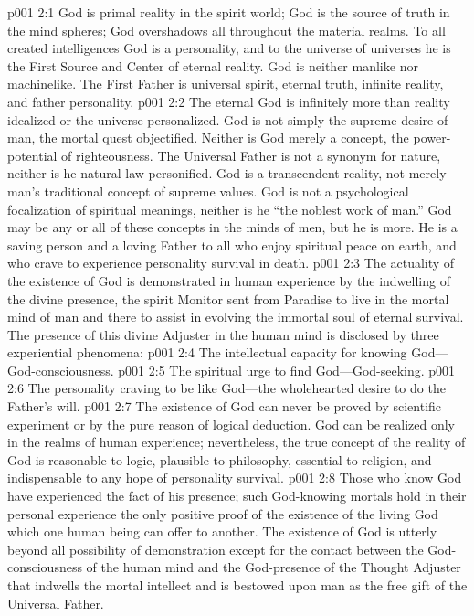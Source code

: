 \vs p001 2:1 God is primal reality in the spirit world; God is the source of truth in the mind spheres; God overshadows all throughout the material realms. To all created intelligences God is a personality, and to the universe of universes he is the First Source and Center of eternal reality. God is neither manlike nor machinelike. The First Father is universal spirit, eternal truth, infinite reality, and father personality.
\pc \vs p001 2:2 The eternal God is infinitely more than reality idealized or the universe personalized. God is not simply the supreme desire of man, the mortal quest objectified. Neither is God merely a concept, the power\hyp{}potential of righteousness. The Universal Father is not a synonym for nature, neither is he natural law personified. God is a transcendent reality, not merely man’s traditional concept of supreme values. God is not a psychological focalization of spiritual meanings, neither is he “the noblest work of man.” God may be any or all of these concepts in the minds of men, but he is more. He is a saving person and a loving Father to all who enjoy spiritual peace on earth, and who crave to experience personality survival in death.\plusone
\pc \vs p001 2:3 The actuality of the existence of God is demonstrated in human experience by the indwelling of the divine presence, the spirit Monitor sent from Paradise to live in the mortal mind of man and there to assist in evolving the immortal soul of eternal survival. The presence of this divine Adjuster in the human mind is disclosed by three experiential phenomena:
\pc \vs p001 2:4 \bibnobreakspace The intellectual capacity for knowing God---God\hyp{}consciousness.
\vs p001 2:5 \bibnobreakspace The spiritual urge to find God---God\hyp{}seeking.
\vs p001 2:6 \bibnobreakspace The personality craving to be like God---the wholehearted desire to do the Father’s will.
\pc \vs p001 2:7 The existence of God can never be proved by scientific experiment or by the pure reason of logical deduction. God can be realized only in the realms of human experience; nevertheless, the true concept of the reality of God is reasonable to logic, plausible to philosophy, essential to religion, and indispensable to any hope of personality survival.
\vs p001 2:8 Those who know God have experienced the fact of his presence; such God\hyp{}knowing mortals hold in their personal experience the only positive proof of the existence of the living God which one human being can offer to another. The existence of God is utterly beyond all possibility of demonstration except for the contact between the God\hyp{}consciousness of the human mind and the God\hyp{}presence of the Thought Adjuster that indwells the mortal intellect and is bestowed upon man as the free gift of the Universal Father.
